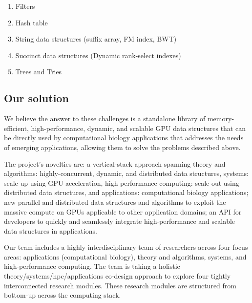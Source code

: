 \begin{enumerate}[noitemsep, leftmargin=*]
  \item Filters
  \item Hash table
  \item String data structures (suffix array, FM index, BWT)
  \item Succinct data structures (Dynamic rank-select indexes)
  \item Trees and Tries
\end{enumerate}


\subsection{Our solution}

We believe the answer to these challenges is a standalone library of
memory-efficient, high-performance, dynamic, and scalable GPU data structures
that can be directly used by computational biology applications that addresses
the needs of emerging applications, allowing them to solve the problems
described above.

The project’s novelties are: a vertical-stack approach spanning theory and
algorithms: highly-concurrent, dynamic, and distributed data structures,
systems: scale up using GPU acceleration, high-performance computing: scale out
using distributed data structures, and applications: computational biology
applications; new parallel and distributed data structures and algorithms to
exploit the massive compute on GPUs applicable to other application domains; an
API for developers to quickly and seamlessly integrate high-performance and
scalable data structures in applications.

Our team includes a highly interdisciplinary team of researchers across four
focus areas: applications (computational biology), theory and algorithms,
systems, and high-performance computing. The team is taking a holistic
theory/systems/hpc/applications co-design approach to explore four tightly
interconnected research modules.
These research modules are structured from bottom-up across the computing stack.


